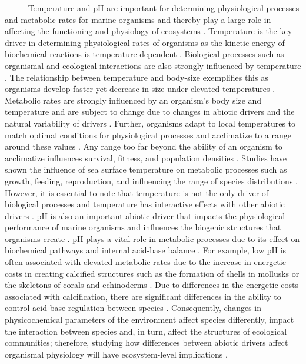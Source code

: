 \documentclass[
]{article}
\begin{document}
~~~~~ Temperature and pH are important for determining physiological
processes and metabolic rates for marine organisms and thereby play a
large role in affecting the functioning and physiology of ecosystems
\citep{woodwell1970effects}. Temperature is the key driver in
determining physiological rates of organisms as the kinetic energy of
biochemical reactions is temperature dependent
\citep{levins1968evolution, somero2002thermal, portner2012integrating}.
Biological processes such as organismal and ecological interactions are
also strongly influenced by temperature
\citep{hochachka2002biochemical}. The relationship between temperature
and body-size exemplifies this as organisms develop faster yet decrease
in size under elevated temperatures \citep{elahi2020historical}.
Metabolic rates are strongly influenced by an organism's body size and
temperature and are subject to change due to changes in abiotic drivers
and the natural variability of drivers
\citep{brown2004metabolic, oconnor2007temperature}. Further, organisms
adapt to local temperatures to match optimal conditions for
physiological processes and acclimatize to a range around these values
\citep{sinclair2016can}. Any range too far beyond the ability of an
organism to acclimatize influences survival, fitness, and population
densities \citep{hochachka2002biochemical}. Studies have shown the
influence of sea surface temperature on metabolic processes such as
growth, feeding, reproduction, and influencing the range of species
distributions
\citep{kordas2011community, sanford2002feeding, pinsky2013marine}.
However, it is essential to note that temperature is not the only driver
of biological processes and temperature has interactive effects with
other abiotic drivers \citep{darling2008quantifying}. pH is also an
important abiotic driver that impacts the physiological performance of
marine organisms and influences the biogenic structures that organisms
create \citep{hofmann2010living}. pH plays a vital role in metabolic
processes due to its effect on biochemical pathways and internal
acid-base balance \citep{gaylord2015ocean}. For example, low pH is often
associated with elevated metabolic rates due to the increase in
energetic costs in creating calcified structures such as the formation
of shells in mollusks or the skeletons of corals and echinoderms
\citep{doney2009ocean, spalding2017energetic}. Due to differences in the
energetic costs associated with calcification, there are significant
differences in the ability to control acid-base regulation between
species \citep{doney2009ocean}. Consequently, changes in physicochemical
parameters of the environment affect species differently, impact the
interaction between species and, in turn, affect the structures of
ecological communities; therefore, studying how differences between
abiotic drivers affect organismal physiology will have ecosystem-level
implications \citep{tomanek2002physiological, barclay2019variation}.
\end{document}
